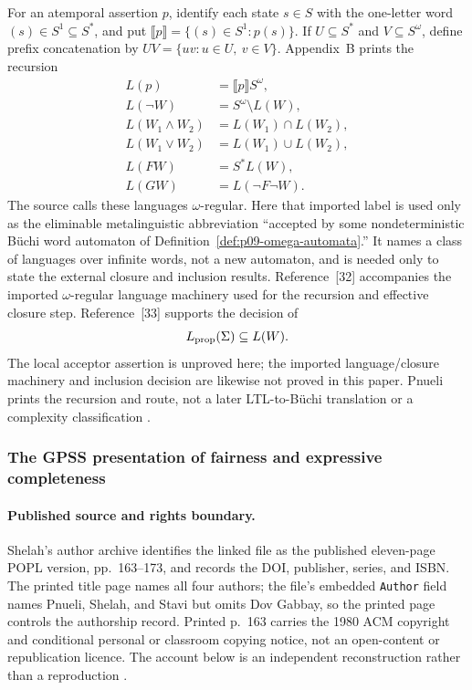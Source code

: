For an atemporal assertion \(p\), identify each state \(s\in S\) with the
one-letter word \((s)\in S^1\subseteq S^*\), and put
\(\llbracket p\rrbracket=\{(s)\in S^1:p(s)\}\).  If
\(U\subseteq S^*\) and \(V\subseteq S^\omega\), define prefix concatenation by
\(UV=\{uv:u\in U,\ v\in V\}\).  Appendix~B prints the recursion
\[
\begin{aligned}
 L(p)&=\llbracket p\rrbracket S^\omega,\\
 L(\neg W)&=S^\omega\setminus L(W),\\
 L(W_1\land W_2)&=L(W_1)\cap L(W_2),\\
 L(W_1\lor W_2)&=L(W_1)\cup L(W_2),\\
 L(FW)&=S^*L(W),\\
 L(GW)&=L(\neg F\neg W).
\end{aligned}
\]
The source calls these languages \(\omega\)-regular.  Here that imported label
is used only as the eliminable metalinguistic abbreviation ``accepted by some
nondeterministic B\"uchi word automaton of
Definition~\ref{def:p09-omega-automata}.''  It names a class of languages over
infinite words, not a new automaton, and is needed only to state the external
closure and inclusion results.  Reference~[32] accompanies the imported
\(\omega\)-regular language machinery used for the recursion and effective
closure step.  Reference~[33] supports the decision of
\[
 L_{\rm prop}(\Sigma)\subseteq L(W).
\]
The local acceptor assertion is unproved here; the imported language/closure
machinery and inclusion decision are likewise not proved in this paper.
Pnueli prints the recursion and route, not a later LTL-to-B\"uchi translation
or a complexity classification
\cite[pp.~55--57]{Pnueli1977,McNaughton1966,Landweber1969}.

\subsubsection{The GPSS presentation of fairness and expressive completeness}

\paragraph{Published source and rights boundary.}
Shelah's author archive identifies the linked file as the published
eleven-page POPL version, pp.~163--173, and records the DOI, publisher, series,
and ISBN.  The printed title page names all four authors; the file's embedded
\texttt{Author} field names Pnueli, Shelah, and Stavi but omits Dov Gabbay, so
the printed page controls the authorship record.
Printed p.~163 carries the 1980 ACM copyright and conditional personal or
classroom copying notice, not an open-content or republication licence.  The
account below is an independent reconstruction rather than a reproduction
\cite[pp.~163--173]{GabbayPnueliShelahStavi1980}.

